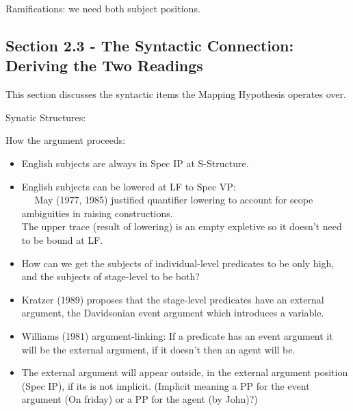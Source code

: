 \documentclass[landscape]{article}
\begin{document}
Ramifications: we need both subject positions.

\subsection*{Section 2.3 - The Syntactic Connection: Deriving the Two Readings }
This section discusses the syntactic items the Mapping Hypothesis operates over.

\begin{example}Synatic Structures:
\end{example}


How the argument proceeds:
\begin{itemize}
\item English subjects are always in Spec IP at S-Structure.
\item English subjects can be lowered at LF to  Spec VP: \\
~~ May (1977, 1985) justified quantifier lowering to account for scope ambiguities in raising constructions.\\
The upper trace (result of lowering) is an empty expletive so it doesn't need to be bound at LF.
\item How can we get the subjects of individual-level predicates to be only high, and the subjects of stage-level to be both?
\item Kratzer (1989) proposes that the stage-level predicates have an external argument,  the Davidsonian event argument which introduces a variable. 
\item Williams (1981) argument-linking: If a predicate has an event argument it will be the external argument, if it doesn't then an agent will be.
\item The external argument will appear outside, in the external argument position (Spec IP), if its is not implicit. (Implicit meaning a PP for the event argument (On friday) or a PP for the agent (by John)?)\\
\end{itemize}
\end{document}
